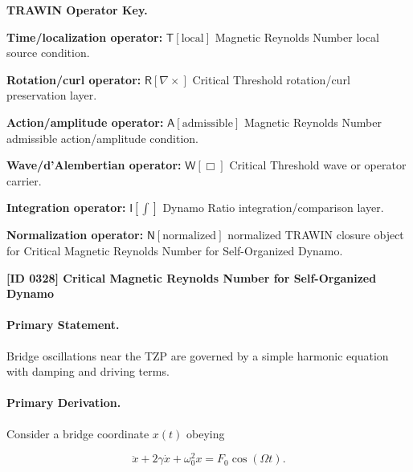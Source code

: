 \par\vspace{0.45\baselineskip}
\noindent\begin{minipage}[t]{\linewidth}
\begingroup
\small
\raggedright
\textbf{TRAWIN Operator Key.}\par
\noindent\textbf{Time/localization operator:} $\mathsf{T}\!\left[\mathrm{local}\right]$ Magnetic Reynolds Number local source condition.\par
\noindent\textbf{Rotation/curl operator:} $\mathsf{R}\!\left[\nabla\times\right]$ Critical Threshold rotation/curl preservation layer.\par
\noindent\textbf{Action/amplitude operator:} $\mathsf{A}\!\left[\mathrm{admissible}\right]$ Magnetic Reynolds Number admissible action/amplitude condition.\par
\noindent\textbf{Wave/d'Alembertian operator:} $\mathsf{W}\!\left[\Box\right]$ Critical Threshold wave or operator carrier.\par
\noindent\textbf{Integration operator:} $\mathsf{I}\!\left[\int\right]$ Dynamo Ratio integration/comparison layer.\par
\noindent\textbf{Normalization operator:} $\mathsf{N}\!\left[\mathrm{normalized}\right]$ normalized TRAWIN closure object for Critical Magnetic Reynolds Number for Self-Organized Dynamo.\par
\endgroup
\end{minipage}

\clearpage
\noindent\textbf{[ID 0328] Critical Magnetic Reynolds Number for Self-Organized Dynamo}\par
\vspace{0.35em}
\paragraph{Primary Statement.}

Bridge oscillations near the TZP are governed by a simple harmonic equation with damping and driving terms.

\paragraph{Primary Derivation.}

Consider a bridge coordinate $x(t)$ obeying

\begin{equation}
\ddot{x} + 2\gamma\dot{x} + \omega_0^2 x = F_0\cos(\Omega t).
\end{equation}

